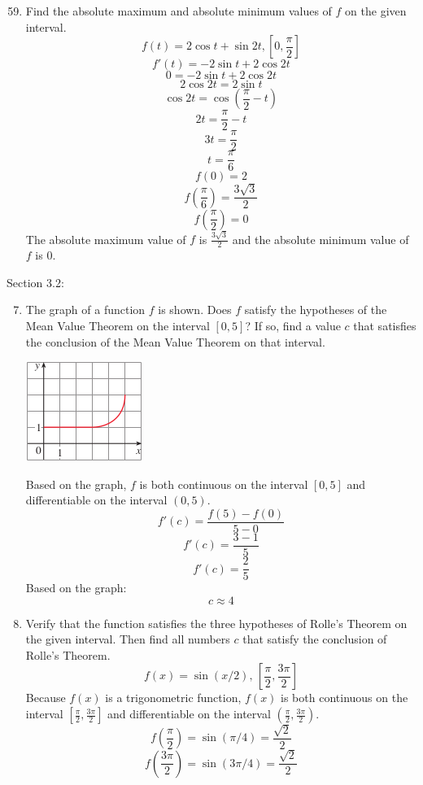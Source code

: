 \documentclass[12pt]{article}
\begin{document}
\begin{enumerate}
    \setcounter{enumi}{58}
    \item Find the absolute maximum and absolute minimum values of $f$ on the given interval.
        \[f(t) = 2\cos t + \sin 2t, [0,\frac{\pi}{2}]\]
        \[f'(t) = -2\sin t + 2\cos 2t\]
        \[0 = -2\sin t + 2\cos 2t\]
        \[2\cos 2t = 2\sin t\]
        \[\cos 2t = \cos (\frac{\pi}{2} - t)\]
        \[2t = \frac{\pi}{2} - t\]
        \[3t = \frac{\pi}{2}\]
        \[t = \frac{\pi}{6}\]
        \[f(0) = 2\]
        \[f(\frac{\pi}{6}) = \frac{3\sqrt{3}}{2}\]
        \[f(\frac{\pi}{2}) = 0\]
        The absolute maximum value of $f$ is ${\displaystyle \frac{3\sqrt{3}}{2}}$ and the absolute minimum value of $f$ is 0.
\end{enumerate}

\newpage
Section 3.2:
\begin{enumerate}
    \setcounter{enumi}{6}
    \item The graph of a function $f$ is shown. Does $f$ satisfy the hypotheses of the Mean Value Theorem on the interval $[0,5]$? If so, find a value $c$ that satisfies the conclusion of the Mean Value Theorem on that interval.
        \begin{center}
            \includegraphics{img/img-0.png}    
        \end{center}    
    Based on the graph, $f$ is both continuous on the interval $[0,5]$ and differentiable on the interval $(0,5)$.
        \[f'(c) = \frac{f(5) - f(0)}{5-0}\]
        \[f'(c) = \frac{3 - 1}{5}\]
        \[f'(c) = \frac{2}{5}\]
    Based on the graph:
        \[c \approx 4\]
    \setcounter{enumi}{10}
    \item Verify that the function satisfies the three hypotheses of Rolle’s Theorem on the given interval. Then find all numbers $c$ that satisfy the conclusion of Rolle’s Theorem.
        \[f(x) = \sin (x/2) \text{, }[\frac{\pi}{2},\frac{3\pi}{2}]\]
    Because $f(x)$ is a trigonometric function, $f(x)$ is both continuous on the interval $[\frac{\pi}{2},\frac{3\pi}{2}]$ and differentiable on the interval $(\frac{\pi}{2},\frac{3\pi}{2})$.
        \[f(\frac{\pi}{2}) = \sin (\pi/4) = \frac{\sqrt{2}}{2}\]
        \[f(\frac{3\pi}{2}) = \sin (3\pi/4) = \frac{\sqrt{2}}{2}\]

\end{enumerate}
\end{document}
